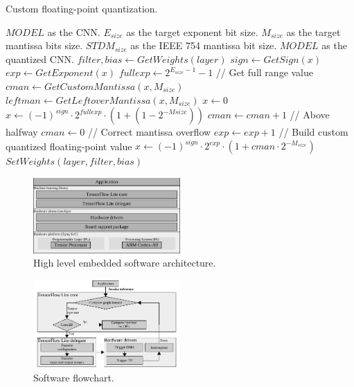 \begin{algorithm}[h!]
	\label{alg:quantize_training}
	\caption{Custom floating-point quantization.}
	\begin{algorithmic}
		\SetAlgoLined
		\renewcommand{\algorithmicrequire}{\textbf{input:}}
		\renewcommand{\algorithmicensure}{\textbf{output:}}
		\REQUIRE $MODEL$ as the CNN.
		\REQUIRE $E_{size}$ as the target exponent bit size.
		\REQUIRE $M_{size}$ as the target mantissa bits size.
		\REQUIRE $STDM_{size}$ as the IEEE 754 mantissa bit size.
		\ENSURE $MODEL$ as the quantized CNN.
		\STATE $filter, bias \gets GetWeights(layer)$
			\STATE $sign \gets GetSign(x)$
			\STATE $exp \gets GetExponent(x)$
			\STATE $fullexp \gets 2^{E_{size}-1}-1$ // Get full range value
			\STATE $cman \gets GetCustomMantissa(x, M_{size})$
			\STATE $leftman \gets GetLeftoverMantissa(x, M_{size})$
				\STATE$x\gets0$
				\STATE$x\gets (-1)^{sign}\cdot2^{fullexp}\cdot(1+(1-2^{-M{size}}))$
			\ELSE
					\STATE $cman \gets cman+1$ // Above halfway
					\STATE $cman \gets 0$ // Correct mantissa overflow
					\STATE $exp \gets exp + 1$
					\ENDIF
				\ENDIF
				\STATE // Build custom quantized floating-point value
				\STATE$x\gets (-1)^{sign}\cdot2^{exp}\cdot(1+cman\cdot2^{-M_{size}})$
			\ENDIF
		\ENDFOR
		\STATE $SetWeights(layer, filter, bias)$
		\ENDIF
		\ENDFOR
	\end{algorithmic}
\end{algorithm}
\begin{figure}[t!]
	\centering
	\includegraphics[width=0.5\textwidth]{./chapters/cnn_accelerator/figures/sw_stack.pdf}
	\caption{High level embedded software architecture.}
	\label{fig:sw_stack}
\end{figure}

\begin{figure}[t!]
	\centering
	\includegraphics[width=0.5\textwidth]{./chapters/cnn_accelerator/figures/sw_stack_flowchart.pdf}
	\caption{Software flowchart.}
	\label{fig:sw_stack_flowchart}
\end{figure}

